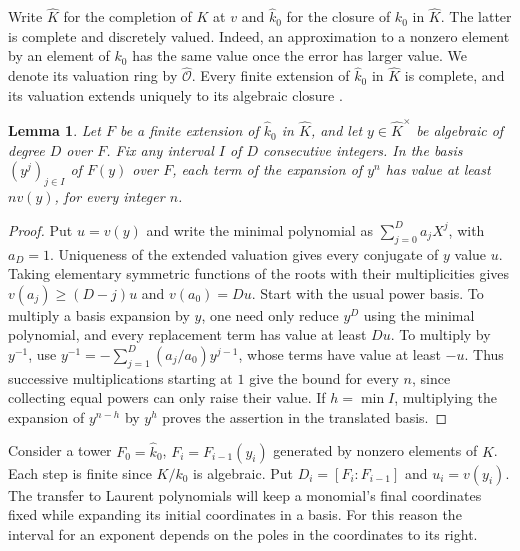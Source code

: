 \documentclass[11pt, letterpaper]{article}
\newtheorem{lemma}[theorem]{Lemma}
\theoremstyle{definition}
\theoremstyle{remark}
\begin{document}
Write $\widehat{K}$ for the completion of $K$ at $v$ and $\widehat{k}_{0}$ for the closure of $k_{0}$ in $\widehat{K}$.
The latter is complete and discretely valued.
Indeed, an approximation to a nonzero element by an element of $k_{0}$ has the same value once the error has larger value.
We denote its valuation ring by $\widehat{\mathcal{O}}$.
Every finite extension of $\widehat{k}_{0}$ in $\widehat{K}$ is complete, and its valuation extends uniquely to its algebraic closure \cite[Proposition~1.2.2 and the discussion in \S4.1]{MR2183496}.

\begin{lemma}
    \label{lem:L}
    Let $F$ be a finite extension of $\widehat{k}_{0}$ in $\widehat{K}$, and let $y \in \widehat{K}^{\times}$ be algebraic of degree $D$ over $F$.
    Fix any interval $I$ of $D$ consecutive integers.
    In the basis $(y^{j})_{j \in I}$ of $F(y)$ over $F$, each term of the expansion of $y^{n}$ has value at least $n v(y)$, for every integer $n$.
\end{lemma}

\begin{proof}
    Put $u = v(y)$ and write the minimal polynomial as $\sum_{j = 0}^{D} a_{j} X^{j}$, with $a_{D} = 1$.
    Uniqueness of the extended valuation gives every conjugate of $y$ value $u$.
    Taking elementary symmetric functions of the roots with their multiplicities gives $v(a_{j}) \ge (D - j)u$ and $v(a_{0}) = Du$.
    Start with the usual power basis.
    To multiply a basis expansion by $y$, one need only reduce $y^{D}$ using the minimal polynomial, and every replacement term has value at least $Du$.
    To multiply by $y^{-1}$, use $y^{-1} = -\sum_{j = 1}^{D}(a_{j}/a_{0})y^{j - 1}$, whose terms have value at least $-u$.
    Thus successive multiplications starting at $1$ give the bound for every $n$, since collecting equal powers can only raise their value.
    If $h = \min I$, multiplying the expansion of $y^{n - h}$ by $y^{h}$ proves the assertion in the translated basis.
\end{proof}

Consider a tower $F_{0} = \widehat{k}_{0}$, $F_{i} = F_{i - 1}(y_{i})$ generated by nonzero elements of $K$.
Each step is finite since $K/k_{0}$ is algebraic.
Put $D_{i} = [F_{i} : F_{i - 1}]$ and $u_{i} = v(y_{i})$.
The transfer to Laurent polynomials will keep a monomial's final coordinates fixed while expanding its initial coordinates in a basis.
For this reason the interval for an exponent depends on the poles in the coordinates to its right.
\end{document}
